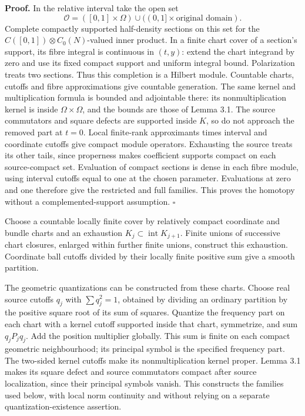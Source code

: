 \documentclass[
  11pt,
]{article}
\begin{document}
\textbf{Proof.} In the relative interval take the open set \[
\mathcal O=([0,1]\times\Omega)\cup
((0,1]\times\text{original domain}).
\tag{5.31}
\] Complete compactly supported half-density sections on this set for
the \(C([0,1])\otimes C_0(N)\)-valued inner product. In a finite chart
cover of a section's support, its fibre integral is continuous in
\((t,y)\): extend the chart integrand by zero and use its fixed compact
support and uniform integral bound. Polarization treats two sections.
Thus this completion is a Hilbert module. Countable charts, cutoffs and
fibre approximations give countable generation. The same kernel and
multiplication formula is bounded and adjointable there: its
nonmultiplication kernel is inside \(\Omega\times\Omega\), and the
bounds are those of Lemma 3.1. The source commutators and square defects
are supported inside \(K\), so do not approach the removed part at
\(t=0\). Local finite-rank approximants times interval and coordinate
cutoffs give compact module operators. Exhausting the source treats its
other tails, since properness makes coefficient supports compact on each
source-compact set. Evaluation of compact sections is dense in each
fibre module, using interval cutoffs equal to one at the chosen
parameter. Evaluations at zero and one therefore give the restricted and
full families. This proves the homotopy without a complemented-support
assumption. \(\square\)

Choose a countable locally finite cover by relatively compact coordinate
and bundle charts and an exhaustion
\(K_j\subset\operatorname{int}K_{j+1}\). Finite unions of successive
chart closures, enlarged within further finite unions, construct this
exhaustion. Coordinate ball cutoffs divided by their locally finite
positive sum give a smooth partition.

The geometric quantizations can be constructed from these charts. Choose
real source cutoffs \(q_j\) with \(\sum q_j^2=1\), obtained by dividing
an ordinary partition by the positive square root of its sum of squares.
Quantize the frequency part on each chart with a kernel cutoff supported
inside that chart, symmetrize, and sum \(q_jP_jq_j\). Add the position
multiplier globally. This sum is finite on each compact geometric
neighbourhood; its principal symbol is the specified frequency part. The
two-sided kernel cutoffs make its nonmultiplication kernel proper. Lemma
3.1 makes its square defect and source commutators compact after source
localization, since their principal symbols vanish. This constructs the
families used below, with local norm continuity and without relying on a
separate quantization-existence assertion.
\end{document}
